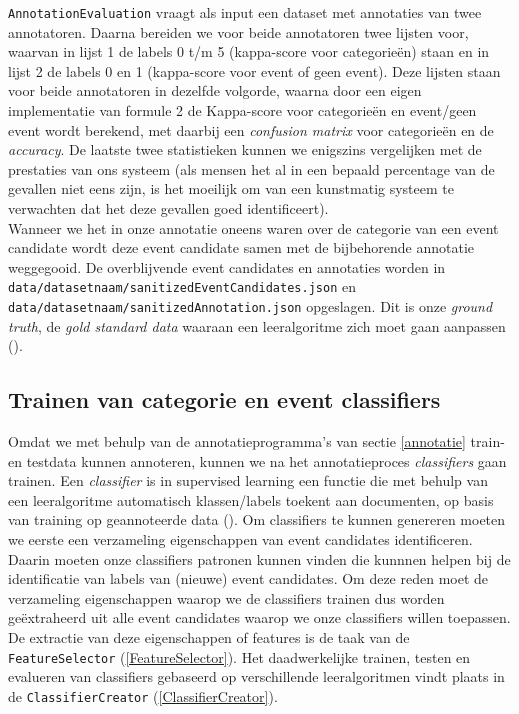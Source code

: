 \documentclass[a4paper,10pt,titlepage]{article}
\def\vl{\\[9pt]}                              %
\def\ss{\subsection}                          %
\def\ttt{\texttt}                             %
\def\it{\textit}                              %
\begin{document}
{{\ttt{AnnotationEvaluation} vraagt als input een dataset met annotaties van twee 
annotatoren. Daarna bereiden we voor beide annotatoren twee lijsten voor, 
waarvan in lijst 1 de labels 0 t/m 5 (kappa-score voor categorie\"en) staan en in 
lijst 2 de labels 0 en 1 (kappa-score voor event of geen event). Deze lijsten 
staan voor beide annotatoren in dezelfde volgorde, waarna door een eigen 
implementatie van formule 2 de Kappa-score voor categorie\"en en event/geen event 
wordt berekend, met daarbij een \it{confusion matrix} voor categorieën en de 
\it{accuracy}. De laatste twee statistieken kunnen we enigszins vergelijken met de prestaties van 
ons systeem (als mensen het al in een bepaald percentage van de gevallen niet 
eens zijn, is het moeilijk om van een kunstmatig systeem te verwachten dat het 
deze gevallen goed identificeert).
\vl
Wanneer we het in onze annotatie oneens waren over de categorie van een event 
candidate wordt deze event candidate samen met de bijbehorende annotatie 
weggegooid. De overblijvende event candidates en annotaties worden in 
\ttt{data/datasetnaam/sanitizedEventCandidates.json} en 
\ttt{data/datasetnaam/sanitizedAnnotation.json} opgeslagen. Dit is onze \it{ground truth}, 
de \it{gold standard data} waaraan een leeralgoritme zich moet gaan aanpassen 
(\citealt{kobielus2014}).

\ss{Trainen van categorie en event classifiers}\label{train}

Omdat we met behulp van de annotatieprogramma's van sectie \ref{annotatie} train- en 
testdata kunnen annoteren, kunnen we na het annotatieproces \it{classifiers} gaan 
trainen. Een \it{classifier} is in supervised learning een functie die met behulp van 
een leeralgoritme automatisch klassen/labels toekent aan documenten, op basis 
van training op geannoteerde data (\citealt{manning2008introduction}). Om classifiers te kunnen 
genereren moeten we eerste een verzameling eigenschappen van event candidates 
identificeren. Daarin moeten onze classifiers patronen kunnen vinden die kunnnen 
helpen bij de identificatie van labels van (nieuwe) event candidates. Om deze 
reden moet de verzameling eigenschappen waarop we de classifiers trainen dus 
worden geëxtraheerd uit alle event candidates waarop we onze classifiers willen 
toepassen. De extractie van deze eigenschappen of features is de taak van de 
\ttt{FeatureSelector} (\ref{FeatureSelector}). Het daadwerkelijke trainen, testen en evalueren van 
classifiers gebaseerd op verschillende leeralgoritmen vindt plaats in de 
\ttt{ClassifierCreator} (\ref{ClassifierCreator}).

}}
\end{document}
